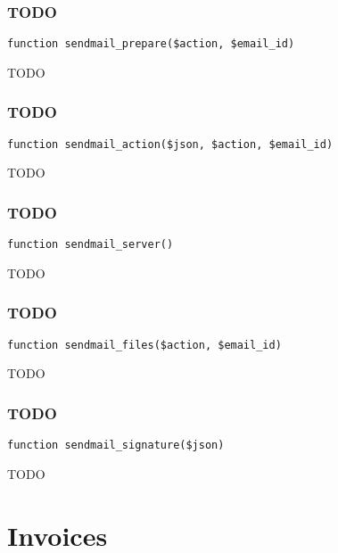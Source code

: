 \documentclass[a4paper]{article}
\begin{document}
\hypertarget{toc134}{}
\subsubsection{TODO}

\begin{lstlisting}
function sendmail_prepare($action, $email_id)
\end{lstlisting}

TODO

\hypertarget{toc135}{}
\subsubsection{TODO}

\begin{lstlisting}
function sendmail_action($json, $action, $email_id)
\end{lstlisting}

TODO

\hypertarget{toc136}{}
\subsubsection{TODO}

\begin{lstlisting}
function sendmail_server()
\end{lstlisting}

TODO

\hypertarget{toc137}{}
\subsubsection{TODO}

\begin{lstlisting}
function sendmail_files($action, $email_id)
\end{lstlisting}

TODO

\hypertarget{toc138}{}
\subsubsection{TODO}

\begin{lstlisting}
function sendmail_signature($json)
\end{lstlisting}

TODO


\hypertarget{toc139}{}
\section{Invoices}
\end{document}
